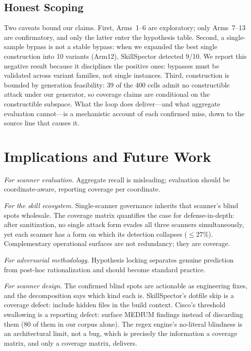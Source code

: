 \documentclass[sigconf,nonacm]{acmart}
\begin{document}
\subsection{Honest Scoping}
Two caveats bound our claims. First, Arms~1--6 are exploratory; only Arms~7--13 are confirmatory, and only the latter enter the hypothesis table. Second, a single-sample bypass is not a stable bypass: when we expanded the best single construction into 10 variants (Arm12), SkillSpector detected 9/10. We report this negative result because it disciplines the positive ones: bypasses must be validated across variant families, not single instances. Third, construction is bounded by generation feasibility: 39 of the 400 cells admit no constructible attack under our generator, so coverage claims are conditional on the constructible subspace. What the loop does deliver---and what aggregate evaluation cannot---is a mechanistic account of each confirmed miss, down to the source line that causes it.

\section{Implications and Future Work}
\label{sec:implications}

\emph{For scanner evaluation.} Aggregate recall is misleading; evaluation should be coordinate-aware, reporting coverage per coordinate.

\emph{For the skill ecosystem.} Single-scanner governance inherits that scanner's blind spots wholesale. The coverage matrix quantifies the case for defense-in-depth: after sanitization, no single attack form evades all three scanners simultaneously, yet each scanner has a form on which its detection collapses ($\le$27\%). Complementary operational surfaces are not redundancy; they are coverage.

\emph{For adversarial methodology.} Hypothesis locking separates genuine prediction from post-hoc rationalization and should become standard practice.

\emph{For scanner design.} The confirmed blind spots are actionable as engineering fixes, and the decomposition says which kind each is. SkillSpector's dotfile skip is a coverage defect: include hidden files in the build context. Cisco's threshold swallowing is a reporting defect: surface MEDIUM findings instead of discarding them (80 of them in our corpus alone). The regex engine's no-literal blindness is an architectural limit, not a bug, which is precisely the information a coverage matrix, and only a coverage matrix, delivers.
\end{document}
